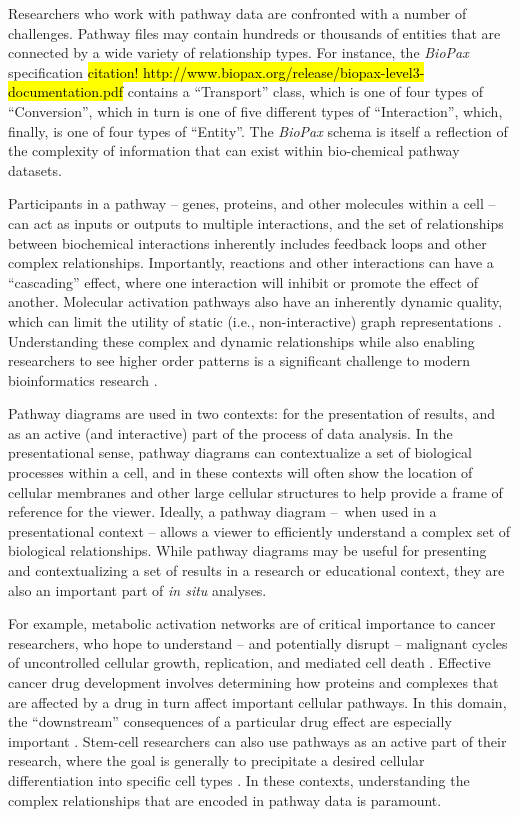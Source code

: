 Researchers who work with pathway data are confronted with a number of challenges.
Pathway files may contain hundreds or thousands of entities that are connected by a wide variety of relationship types.
For instance, the \emph{BioPax} specification \hl{citation! http://www.biopax.org/release/biopax-level3-documentation.pdf} contains a ``Transport'' class, which is one of four types of ``Conversion'', which in turn is one of five different types of ``Interaction'', which, finally, is one of four types of ``Entity''.
The \emph{BioPax} schema is itself a reflection of the complexity of information that can exist within bio-chemical pathway datasets.

Participants in a pathway -- genes, proteins, and other molecules within a cell -- can act as inputs or outputs to multiple interactions, and the set of relationships between biochemical interactions inherently includes feedback loops and other complex relationships.
Importantly, reactions and other interactions can have a ``cascading'' effect, where one interaction will inhibit or promote the effect of another.
Molecular activation pathways also have an inherently dynamic quality, which can limit the utility of static (i.e., non-interactive) graph representations \cite{kitano2002systems}.
Understanding these complex and dynamic relationships while also enabling researchers to see higher order patterns is a significant challenge to modern bioinformatics research \cite{saraiya2005visualizing}.

Pathway diagrams are used in two contexts: for the presentation of results, and as an active (and interactive) part of the process of data analysis.
In the presentational sense, pathway diagrams can contextualize a set of biological processes within a cell, and in these contexts will often show the location of cellular membranes and other large cellular structures to help provide a frame of reference for the viewer.
Ideally, a pathway diagram --~when used in a presentational context -- allows a viewer to efficiently understand a complex set of biological relationships.
While pathway diagrams may be useful for presenting and contextualizing a set of results in a research or educational context, they are also an important part of \emph{in situ} analyses.

For example, metabolic activation networks are of critical importance to cancer researchers, who hope to understand -- and potentially disrupt -- malignant cycles of uncontrolled cellular growth, replication, and mediated cell death \cite{cairns2011regulation}.
Effective cancer drug development involves determining how proteins and complexes that are affected by a drug in turn affect important cellular pathways.
In this domain, the ``downstream'' consequences of a particular drug effect are especially important \cite{luo2003targeting}.
Stem-cell researchers can also use pathways as an active part of their research, where the goal is generally to precipitate a desired cellular differentiation into specific cell types \cite{reya2001stem}.
In these contexts, understanding the complex relationships that are encoded in pathway data is paramount.

